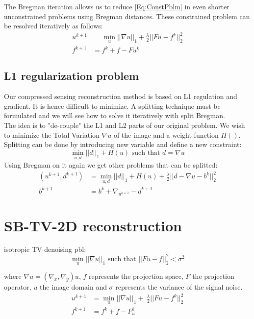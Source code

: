     The Bregman iteration allows us to reduce \ref{Eq:ConstPblm} in even shorter unconstrained problems using Bregman distances. These constrained problem can be resolved iteratively as follows:
    \begin{equation}
        \begin{aligned}
            u^{k+1} &= \min_{u} ||\nabla u||_1 + \frac{\lambda}{2}||Fu - f^k||_2^2 \\
           f^{k+1} &= f^k + f - Fu^k
        \end{aligned}
    \end{equation}
    \subsection{L1 regularization problem}
    Our compressed sensing reconstruction method is based on L1 regulation and gradient. It is hence difficult to minimize. A splitting technique must be formulated and we will see how to solve it iteratively with split Bregman.\\
    The idea is to "de-couple" the L1 and L2 parts of our original problem. We wish to minimize the Total Variation $\nabla u$ of the image and a weight function $H()$. Splitting can be done by introducing new variable and define a new constraint:
    \begin{equation}
        \label{Eq:L1Const}
        \min_{u,d}||d||_1 + H(u) \mbox{ such that } d = \nabla u
    \end{equation}
    Using Bregman on it again we get other problems that can be splitted:%
    \begin{equation}
        \begin{aligned}
            (u^{k+1},d^{k+1}) &= \min_{u,d} ||d||_1 + H(u) +     \frac{\lambda}{2}||d - \nabla u - b^k||^2_2\\
            b^{k+1} &= b^k + \nabla_{u^{k+1}} - d^{k+1}
    \end{aligned}
    \end{equation}
\section{SB-TV-2D reconstruction}
    isotropic TV denoising pbl: 
    \begin{equation}
        \min_{u} ||\nabla u||_1 \mbox{ such that } ||Fu - f||_2^2 < \sigma^2
    \end{equation}
    
    where $\nabla u = (\nabla_x,\nabla_y)u$, $f$ represents the projection space, $F$ the projection operator, $u$ the image domain and $\sigma$ represents the variance of the signal noise.
    \begin{equation}
        \begin{aligned}
            u^{k+1} &= \min_{u}||\nabla u||_1 + \ \frac{\lambda}{2}||Fu - f^k||_2^2\\
            f^{k+1} &= f^k + f - F_u^k
        \end{aligned}
    \end{equation}

